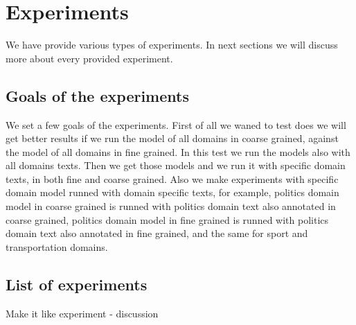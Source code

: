 \documentclass[thesis=M,english]{FITthesis}[2018/05/30]
\begin{document}
\chapter{Experiments}
We have provide various types of experiments. In next sections we will discuss more about every provided experiment.

\section{Goals of the experiments}
We set a few goals of the experiments. First of all we waned to test does we will get better results if we run the model of all domains in coarse grained, against the model of all domains in fine grained. In this test we run the models also with all domains texts. Then we get those models and we run it with specific domain texts, in both fine and coarse grained. Also we make experiments with specific domain model runned with domain specific texts, for example, politics domain model in coarse grained is runned with politics domain text also annotated in coarse grained, politics domain model in fine grained is runned with politics domain text also annotated in fine grained, and the same for sport and transportation domains.

\section{List of experiments}
Make it like experiment - discussion

%	
\end{document}
